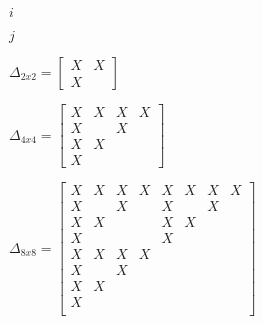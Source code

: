 \documentclass[10pt]{book}
\begin{document}
\begin{mdSnippets}
\begin{mdInlineSnippet}[865c0c0b4ab0e063e5caa3387c1a8741]%
$i$\end{mdInlineSnippet}%
\begin{mdInlineSnippet}[363b122c528f54df4a0446b6bab05515]%
$j$\end{mdInlineSnippet}%
\begin{mdInlineSnippet}[3f7826d6378394876f99c5d26757aef7]%
$ \Delta_{2x2} = \begin{bmatrix}X & X\\X & ~\end{bmatrix}$\end{mdInlineSnippet}%
\begin{mdInlineSnippet}[9dc4ec0366694cca3d80e24773c5dc0f]%
$\Delta_{4x4} = \begin{bmatrix}X & X & X & X\\X & ~ & X & ~\\X & X & ~ & ~\\X & ~ & ~ & ~\end{bmatrix}$\end{mdInlineSnippet}%
\begin{mdInlineSnippet}[7437405d85ab0560502ce89a25e49e29]%
$\Delta_{8x8} = \begin{bmatrix}X & X & X & X & X & X & X & X\\X & ~ & X & ~ & X & ~ & X & ~\\X & X & ~ & ~ & X & X & ~ & ~\\X & ~ & ~ & ~ & X & ~ & ~ & ~\\X & X & X & X & ~ & ~ & ~ & ~\\X & ~ & X & ~ & ~ & ~ & ~ & ~\\X & X & ~ & ~ & ~ & ~ & ~ & ~\\X & ~ & ~ & ~ & ~ & ~ & ~ & ~\\\end{bmatrix}$\end{mdInlineSnippet}%
\begin{mdInlineSnippet}[c0fbe0f02253be7138dd578dd01bb0de]%

\end{mdInlineSnippet}
\end{mdSnippets}
\end{document}
